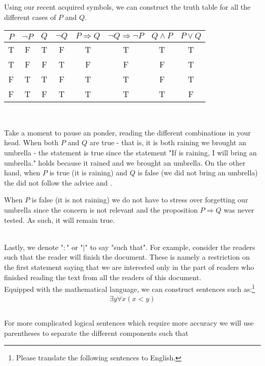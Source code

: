 \documentclass{tufte-handout} %
\theoremstyle{definition}
\theoremstyle{remark}
\begin{document}
Using our recent acquired symbols, we can construct the truth table for all the different cases of $P$ and $Q$.
\begin{center}
\begin{tabular}{|c|c|c|c|c|c|c|c|}
\hline
$P$ & $\neg P$ & $Q$ & $\neg Q$ & $P \Rightarrow Q$ & $\neg Q \Rightarrow \neg P$ & $Q \wedge P$ & $P \vee Q$\\
\hline
T & F & T & F & T & T & T & T\\
T & F & F & T & F & F & F & T\\
F & T & T & F & T & T & F & T \\
F & T & F & T & T & T & T & F\\
\hline
\end{tabular}
\\
\end{center}
Take a moment to pause an ponder, reading the different combinations in your head. When both $P$ and $Q$ are true - that is, it is both raining we brought an umbrella - the statement is true since the statement "If is raining, I will bring an umbrella." holds because it rained and we brought an umbrella. On the other hand, when $P$ is true (it is raining) and $Q$ is false (we did not bring an umbrella) the did not follow the advice and .

When $P$ is false (it is not raining) we do not have to stress over forgetting our umbrella since the concern is not relevant and the proposition $P\Rightarrow Q$ was never tested. As such, it will remain true.

\\

Lastly, we denote "$:$" or "$|$" to say "such that". For example, consider the readers such that the reader will finish the document. These is namely a restriction on the first statement saying that we are interested only in the part of readers who finished reading the text from all the readers of this document. \\
Equipped with the mathematical language, we can construct sentences such as:\footnote{Please translate the following sentences to English.}
\begin{align*}
    \exists y\forall x(x<y) \\    
\end{align*}
\\
For more complicated logical sentences which require more accuracy we will use parentheses to separate the different components such that 
\end{document}
